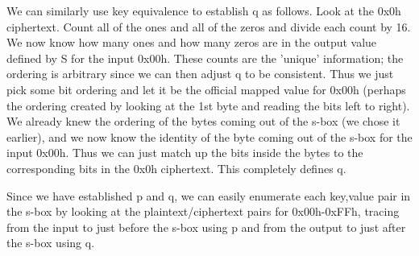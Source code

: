 \documentclass[11pt]{article}
\begin{document}
\begin{enumerate}[(a)]
We can similarly use key equivalence to establish q as follows. Look at the 0x0h ciphertext. Count all of the ones and all of the zeros and divide each count by 16. We now know how many ones and how many zeros are in the output value defined by S for the input 0x00h. These counts are the 'unique' information; the ordering is arbitrary since we can then adjust q to be consistent. Thus we just pick some bit ordering and let it be the official mapped value for 0x00h (perhaps the ordering created by looking at the 1st byte and reading the bits left to right). We already knew the ordering of the bytes coming out of the s-box (we chose it earlier), and we now know the identity of the byte coming out of the s-box for the input 0x00h. Thus we can just match up the bits inside the bytes to the corresponding bits in the 0x0h ciphertext. This completely defines q.

Since we have established p and q, we can easily enumerate each key,value pair in the s-box by looking at the plaintext/ciphertext pairs for 0x00h-0xFFh, tracing from the input to just before the s-box using p and from the output to just after the s-box using q.

\end{enumerate}
\end{document}
